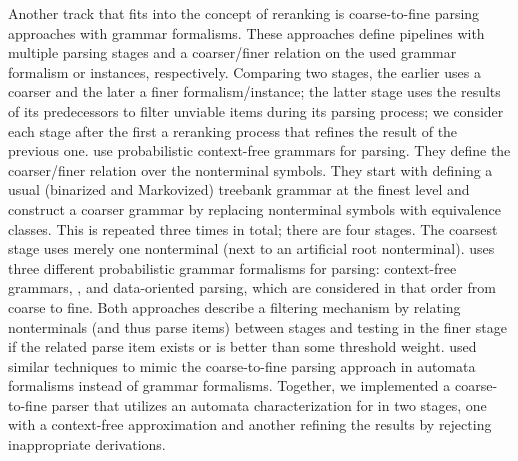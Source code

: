 \documentclass[../../document.tex]{subfiles}
\begin{document}
    Another track that fits into the concept of reranking is coarse-to-fine parsing approaches with grammar formalisms.
    These approaches define pipelines with multiple parsing stages and a coarser/finer relation on the used grammar formalism or instances, respectively.
    Comparing two stages, the earlier uses a coarser and the later a finer formalism/instance; the latter stage uses the results of its predecessors to filter unviable items during its parsing process; we consider each stage after the first a reranking process that refines the result of the previous one.
     use probabilistic context-free grammars for parsing.
    They define the coarser/finer relation over the nonterminal symbols.
    They start with defining a usual (binarized and Markovized) treebank grammar at the finest level and construct a coarser grammar by replacing nonterminal symbols with equivalence classes.
    This is repeated three times in total; there are four stages. The coarsest stage uses merely one nonterminal (next to an artificial root nonterminal).
     uses three different probabilistic grammar formalisms for parsing: context-free grammars, , and data-oriented parsing, which are considered in that order from coarse to fine.
    Both approaches describe a filtering mechanism by relating nonterminals (and thus parse items) between stages and testing in the finer stage if the related parse item exists or is better than some threshold weight.
     used similar techniques to mimic the coarse-to-fine parsing approach in automata formalisms instead of grammar formalisms.
    Together, we implemented a coarse-to-fine parser that utilizes an automata characterization for  in two stages, one with a context-free approximation and another refining the results by rejecting inappropriate derivations. \citep{RupDen19} 
    
\end{document}
